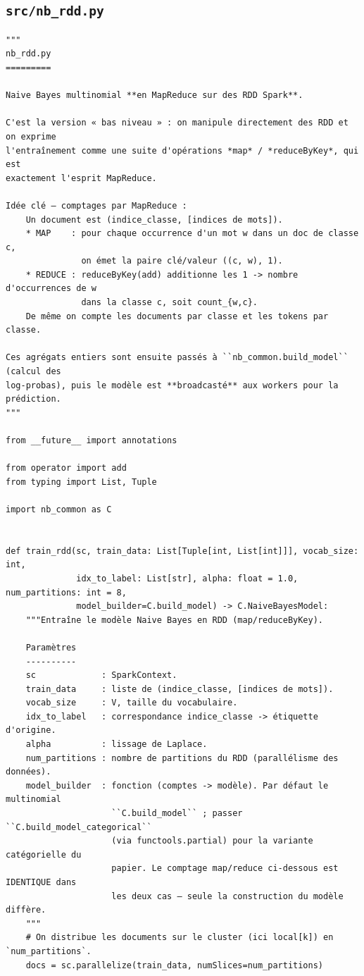 \subsection{\texttt{src/nb\_rdd.py}}
\begin{lstlisting}[style=py]
"""
nb_rdd.py
=========

Naive Bayes multinomial **en MapReduce sur des RDD Spark**.

C'est la version « bas niveau » : on manipule directement des RDD et on exprime
l'entraînement comme une suite d'opérations *map* / *reduceByKey*, qui est
exactement l'esprit MapReduce.

Idée clé — comptages par MapReduce :
    Un document est (indice_classe, [indices de mots]).
    * MAP    : pour chaque occurrence d'un mot w dans un doc de classe c,
               on émet la paire clé/valeur ((c, w), 1).
    * REDUCE : reduceByKey(add) additionne les 1 -> nombre d'occurrences de w
               dans la classe c, soit count_{w,c}.
    De même on compte les documents par classe et les tokens par classe.

Ces agrégats entiers sont ensuite passés à ``nb_common.build_model`` (calcul des
log-probas), puis le modèle est **broadcasté** aux workers pour la prédiction.
"""

from __future__ import annotations

from operator import add
from typing import List, Tuple

import nb_common as C


def train_rdd(sc, train_data: List[Tuple[int, List[int]]], vocab_size: int,
              idx_to_label: List[str], alpha: float = 1.0, num_partitions: int = 8,
              model_builder=C.build_model) -> C.NaiveBayesModel:
    """Entraîne le modèle Naive Bayes en RDD (map/reduceByKey).

    Paramètres
    ----------
    sc             : SparkContext.
    train_data     : liste de (indice_classe, [indices de mots]).
    vocab_size     : V, taille du vocabulaire.
    idx_to_label   : correspondance indice_classe -> étiquette d'origine.
    alpha          : lissage de Laplace.
    num_partitions : nombre de partitions du RDD (parallélisme des données).
    model_builder  : fonction (comptes -> modèle). Par défaut le multinomial
                     ``C.build_model`` ; passer ``C.build_model_categorical``
                     (via functools.partial) pour la variante catégorielle du
                     papier. Le comptage map/reduce ci-dessous est IDENTIQUE dans
                     les deux cas — seule la construction du modèle diffère.
    """
    # On distribue les documents sur le cluster (ici local[k]) en `num_partitions`.
    docs = sc.parallelize(train_data, numSlices=num_partitions)


\end{lstlisting}
